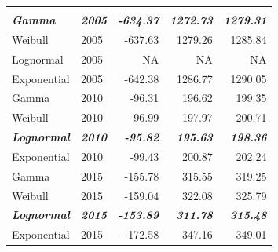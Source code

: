 \documentclass[
11pt, %
oneside, %
english, %
singlespacing, %
]{macthesis} %
\begin{document}
\begin{table}
\begin{tabular}{llrrr}
\addlinespace[0.3em]
\multicolumn{5}{l}{\textbf{Destination: Restaurant}}\\
\begingroup\fontsize{10}{12}\selectfont \em{\textbf{\hspace{1em}Gamma}}\endgroup & \begingroup\fontsize{10}{12}\selectfont \em{\textbf{2005}}\endgroup & \begingroup\fontsize{10}{12}\selectfont \em{\textbf{-634.37}}\endgroup & \begingroup\fontsize{10}{12}\selectfont \em{\textbf{1272.73}}\endgroup & \begingroup\fontsize{10}{12}\selectfont \em{\textbf{1279.31}}\endgroup\\
\hspace{1em}Weibull & 2005 & -637.63 & 1279.26 & 1285.84\\
\hspace{1em}Lognormal & 2005 & NA & NA & \vphantom{1} NA\\
\hspace{1em}Exponential & 2005 & -642.38 & 1286.77 & 1290.05\\
\hspace{1em}Gamma & 2010 & -96.31 & 196.62 & 199.35\\
\hspace{1em}Weibull & 2010 & -96.99 & 197.97 & 200.71\\
\begingroup\fontsize{10}{12}\selectfont \em{\textbf{\hspace{1em}Lognormal}}\endgroup & \begingroup\fontsize{10}{12}\selectfont \em{\textbf{2010}}\endgroup & \begingroup\fontsize{10}{12}\selectfont \em{\textbf{-95.82}}\endgroup & \begingroup\fontsize{10}{12}\selectfont \em{\textbf{195.63}}\endgroup & \begingroup\fontsize{10}{12}\selectfont \em{\textbf{198.36}}\endgroup\\
\hspace{1em}Exponential & 2010 & -99.43 & 200.87 & 202.24\\
\hspace{1em}Gamma & 2015 & -155.78 & 315.55 & 319.25\\
\hspace{1em}Weibull & 2015 & -159.04 & 322.08 & 325.79\\
\begingroup\fontsize{10}{12}\selectfont \em{\textbf{\hspace{1em}Lognormal}}\endgroup & \begingroup\fontsize{10}{12}\selectfont \em{\textbf{2015}}\endgroup & \begingroup\fontsize{10}{12}\selectfont \em{\textbf{-153.89}}\endgroup & \begingroup\fontsize{10}{12}\selectfont \em{\textbf{311.78}}\endgroup & \begingroup\fontsize{10}{12}\selectfont \em{\textbf{315.48}}\endgroup\\
\hspace{1em}Exponential & 2015 & -172.58 & 347.16 & 349.01\\

\end{tabular}
\end{table}
\end{document}
